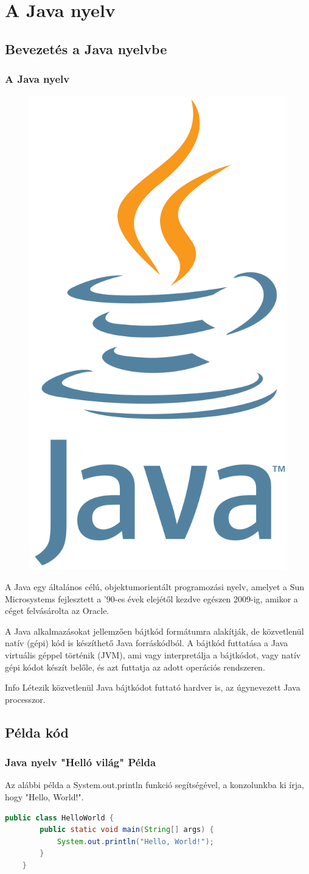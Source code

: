 \documentclass[10pt]{beamer}
\begin{document}
	\transboxin
	\section{A Java nyelv}
	\subsection{Bevezetés a Java nyelvbe}
	\begin{frame}
		\frametitle{A Java nyelv}
		\hypertarget{java}{}

		\begin{figure}
			\includegraphics[height=0.2\textwidth]{java-logo.png} %
		\end{figure}

		\hspace{0.25cm} A Java egy általános célú, objektumorientált programozási
		nyelv, amelyet a Sun Microsystems fejlesztett a ’90-es évek elejétől kezdve egészen
		2009-ig, amikor a céget felvásárolta az Oracle. \pause

		\vspace{0.5cm}
		\hspace{0.25cm} A Java alkalmazásokat jellemzően bájtkód formátumra
		alakítják, de közvetlenül natív (gépi) kód is készíthető Java forráskódból.
		A bájtkód futtatása a Java virtuális géppel történik (JVM), ami vagy interpretálja
		a bájtkódot, vagy natív gépi kódot készít belőle, és azt futtatja az adott operációs
		rendszeren. \pause

		\vspace{1cm}
		\begin{block}{Info}
			Létezik közvetlenül Java bájtkódot futtató hardver is, az úgynevezett Java
			processzor.
		\end{block}
	\end{frame}

	\subsection{Példa kód}
	\begin{frame}[fragile]
		\frametitle{Java nyelv "Helló világ" Példa}

		Az alábbi példa a System.out.println funkció segítségével, a konzolunkba ki írja,
		hogy "Hello, World!". \begin{lstlisting}[language=Java]
    public class HelloWorld {
        public static void main(String[] args) {
            System.out.println("Hello, World!");
        }
    }
  \end{lstlisting}
	\end{frame}
\end{document}
